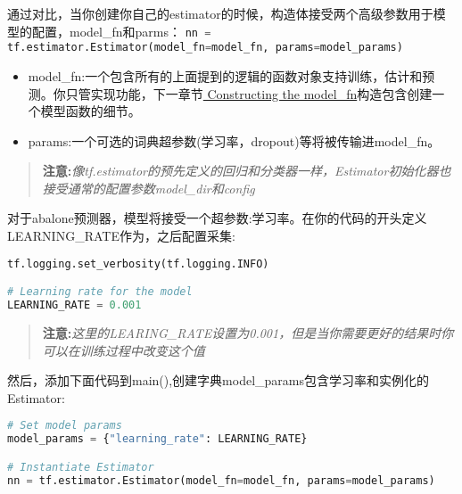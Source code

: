 通过对比，当你创建你自己的estimator的时候，构造体接受两个高级参数用于模型的配置，model\_fn和parms：
\lstinline[language=Python]{nn = tf.estimator.Estimator(model_fn=model_fn, params=model_params)}
\begin{itemize}
\item model\_fn:一个包含所有的上面提到的逻辑的函数对象支持训练，估计和预测。你只管实现功能，下一章节\href{https://www.tensorflow.org/extend/estimators#constructing-modelfn}{ Constructing the model\_fn}构造包含创建一个模型函数的细节。
\item params:一个可选的词典超参数(学习率，dropout)等将被传输进model\_fn。
\end{itemize}
\begin{quote}
\textbf{注意:}\emph{像tf.estimator的预先定义的回归和分类器一样，Estimator初始化器也接受通常的配置参数model\_dir和config}
\end{quote}
对于abalone预测器，模型将接受一个超参数:学习率。在你的代码的开头定义LEARNING\_RATE作为，之后配置采集:
\begin{lstlisting}[language=Python]
tf.logging.set_verbosity(tf.logging.INFO)

# Learning rate for the model
LEARNING_RATE = 0.001
\end{lstlisting}
\begin{quote}
\textbf{注意:}\emph{这里的LEARING\_RATE设置为0.001，但是当你需要更好的结果时你可以在训练过程中改变这个值}
\end{quote}
然后，添加下面代码到main(),创建字典model\_params包含学习率和实例化的Estimator:
\begin{lstlisting}[language=Python]
# Set model params
model_params = {"learning_rate": LEARNING_RATE}

# Instantiate Estimator
nn = tf.estimator.Estimator(model_fn=model_fn, params=model_params)
\end{lstlisting}
